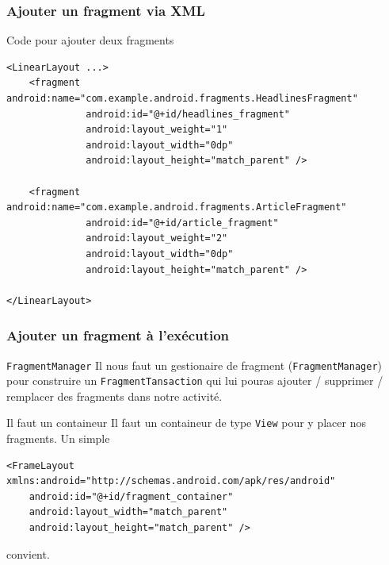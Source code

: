 \documentclass{beamer}
\begin{document}
\begin{frame}[fragile]
\frametitle{Ajouter un fragment via XML}
\begin{block}{Code pour ajouter deux fragments}
\lstset{language=xml}
\begin{lstlisting}
<LinearLayout ...>
    <fragment android:name="com.example.android.fragments.HeadlinesFragment"
              android:id="@+id/headlines_fragment"
              android:layout_weight="1"
              android:layout_width="0dp"
              android:layout_height="match_parent" />

    <fragment android:name="com.example.android.fragments.ArticleFragment"
              android:id="@+id/article_fragment"
              android:layout_weight="2"
              android:layout_width="0dp"
              android:layout_height="match_parent" />

</LinearLayout>

\end{lstlisting}
\end{block}
\end{frame}

\begin{frame}[fragile]
\frametitle{Ajouter un fragment à l'exécution}

\begin{block}{\verb!FragmentManager!}
Il nous faut un gestionaire de fragment (\verb!FragmentManager!) pour construire un \verb!FragmentTansaction! qui lui pouras ajouter / supprimer / remplacer des fragments dans notre activité.
\end{block}
\pause
\begin{alertblock}{Il faut un containeur}
Il faut un containeur de type \verb!View! pour y placer nos fragments. Un simple
\lstset{language=xml}
\begin{lstlisting}
<FrameLayout xmlns:android="http://schemas.android.com/apk/res/android"
    android:id="@+id/fragment_container"
    android:layout_width="match_parent"
    android:layout_height="match_parent" />
\end{lstlisting}
    convient.
\end{alertblock}
\end{frame}
\end{document}
